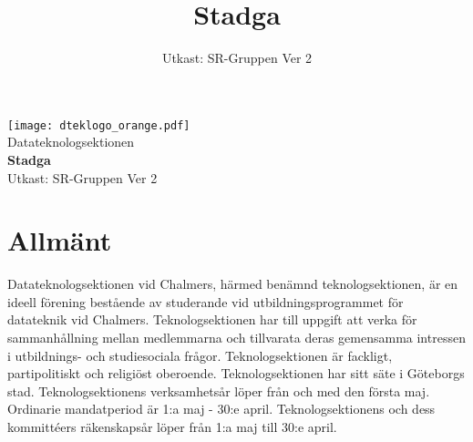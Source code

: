 \documentclass[a4paper]{dtek}
\title{Stadga}
\date{Utkast: SR-Gruppen Ver 2}
\begin{document}
\begin{titlepage}
  \thispagestyle{empty} %
  \vspace*{\fill}
  \begin{center}
    \texttt{[image: dteklogo\_orange.pdf]}\\[3em]
    {\Huge Datateknologsektionen}\\[3em]
    {\Huge \textbf{Stadga}}\\[1em]
    Utkast: SR-Gruppen Ver 2\\[20em]
  \end{center}
  \vspace*{\fill}
\end{titlepage}

\makeheadfoot

\setcounter{tocdepth}{2}
\tableofcontents

\section{Allmänt}
\para[Ändamål]
Datateknologsektionen vid Chalmers, härmed benämnd teknologsektionen, är en ideell förening bestående av studerande vid utbildningsprogrammet för datateknik vid Chalmers.
\para
Teknologsektionen har till uppgift att verka för sammanhållning mellan medlemmarna och tillvarata deras gemensamma intressen i utbildnings- och studiesociala frågor.
\para
Teknologsektionen är fackligt, partipolitiskt och religiöst oberoende.
\para
Teknologsektionen har sitt säte i Göteborgs stad.
\para[Verksamhetsår]
Teknologsektionens verksamhetsår löper från och med den första maj.
\para
Ordinarie mandatperiod är 1:a maj - 30:e april.
\para[Räkenskapsår]
Teknologsektionens och dess kommittéers räkenskapsår löper från 1:a maj till 30:e april.
\end{document}
